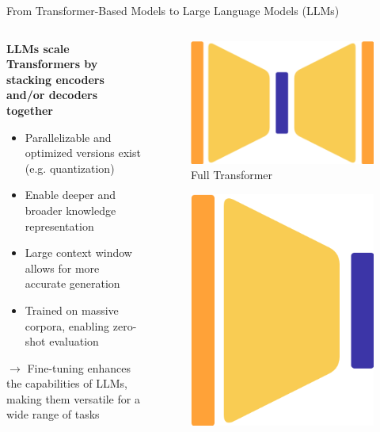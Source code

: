 \documentclass[11pt,aspectratio=169]{beamer}
\begin{document}
\begin{frame}{From Transformer-Based Models to Large Language Models (LLMs)}

\begin{columns}
    \begin{column}{0.7\linewidth}
        \vspace{-0.3cm}
        \begin{center}
        \textbf{LLMs scale Transformers by stacking encoders and/or decoders together}
        \end{center}
        \vspace{0.6cm}
        \begin{itemize}
            \item Parallelizable and optimized versions exist (e.g. quantization)
            \item Enable deeper and broader knowledge representation
            \item Large context window allows for more accurate generation
            \item Trained on massive corpora, enabling zero-shot evaluation
        \end{itemize}
    \vspace{0.6cm}
    $\longrightarrow$ Fine-tuning enhances the capabilities of LLMs, making them versatile for a wide range of tasks
    \end{column}
    \begin{column}{0.3\linewidth}
        \begin{figure}
            \includegraphics[width=0.45\linewidth]{ed_encoder_decoder.png}
            \caption{\centering\footnotesize Full Transformer}
        \end{figure}
        \vspace{-0.6cm}
        \begin{figure}
            \includegraphics[width=0.24\linewidth]{ed_encoder_only.png}

\end{figure}
\end{column}
\end{columns}
\end{frame}
\end{document}
